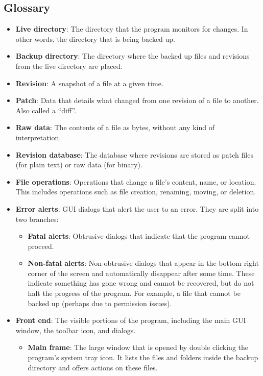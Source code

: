 \documentclass[12pt,a4paper]{article}
\begin{document}
\subsection{Glossary}
\begin{itemize}
\item \textbf{Live directory}: The directory that the program monitors for changes. In other words, the directory that is being backed up.
\item \textbf{Backup directory}: The directory where the backed up files and revisions from the live directory are placed.
\item \textbf{Revision}: A snapshot of a file at a given time.
\item \textbf{Patch}: Data that details what changed from one revision of a file to another. Also called a ``diff''.
\item \textbf{Raw data}: The contents of a file as bytes, without any kind of interpretation.
\item \textbf{Revision database}: The database where revisions are stored as patch files (for plain text) or raw data (for binary).
\item \textbf{File operations}: Operations that change a file's content, name, or location. This includes operations such as file creation, renaming, moving, or deletion.
\item \textbf{Error alerts}: GUI dialogs that alert the user to an error. They are split into two branches:
	\begin{itemize}
	\item \textbf{Fatal alerts}: Obtrusive dialogs that indicate that the program cannot proceed.
	\item \textbf{Non-fatal alerts}: Non-obtrusive dialogs that appear in the bottom right corner of the screen and automatically disappear after some time. These indicate something has gone wrong and cannot be recovered, but do not halt the progress of the program. For example, a file that cannot be backed up (perhaps due to permission issues).
	\end{itemize}
\item \textbf{Front end}: The visible portions of the program, including the main GUI window, the toolbar icon, and dialogs.
	\begin{itemize}
	\item \textbf{Main frame}: The large window that is opened by double clicking the program's system tray icon. It lists the files and folders inside the backup directory and offers actions on these files.

\end{itemize}
\end{itemize}
\end{document}
